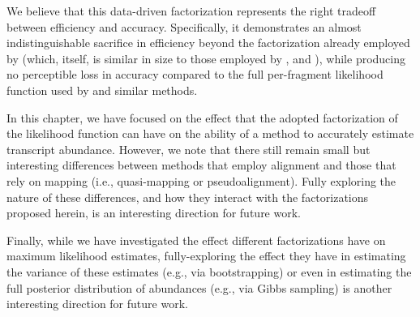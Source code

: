 We believe that this data-driven factorization represents the right tradeoff
between efficiency and accuracy. Specifically, it demonstrates an almost
indistinguishable sacrifice in efficiency beyond the factorization already
employed by \salmon (which, itself, is similar in size to those employed by
\mmseq, \sailfish and \kallisto), while producing no perceptible loss in
accuracy compared to the full per-fragment likelihood function used by \rsem and
similar methods.

In this chapter, we have focused on the effect that the adopted factorization of
the likelihood function can have on the ability of a method to accurately
estimate transcript abundance. However, we note that there still remain small
but interesting differences between methods that employ alignment and those that
rely on mapping (i.e., quasi-mapping or pseudoalignment). Fully exploring the
nature of these differences, and how they interact with the factorizations
proposed herein, is an interesting direction for future work.

Finally, while we have investigated the effect different factorizations have on
maximum likelihood estimates, fully-exploring the effect they have in estimating
the variance of these estimates (e.g., via bootstrapping) or even in estimating
the full posterior distribution of abundances (e.g., via Gibbs sampling) is
another interesting direction for future work.\\